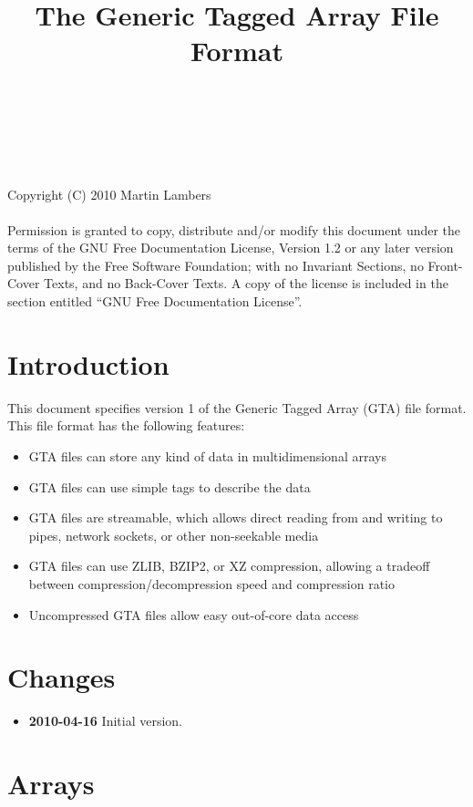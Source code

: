 \documentclass[a4paper,11pt]{article}
\begin{document}
\title{The Generic Tagged Array File Format}
\author{~}
\date{~}
\maketitle

\noindent
Copyright (C) 2010 Martin Lambers\\~\\
Permission is granted to copy, distribute and/or modify this document
under the terms of the GNU Free Documentation License, Version 1.2 or
any later version published by the Free Software Foundation; with no
Invariant Sections, no Front-Cover Texts, and no Back-Cover Texts.  A
copy of the license is included in the section entitled ``GNU Free
Documentation License''.


\section{Introduction}

This document specifies version 1 of the Generic Tagged Array (GTA) file format.
This file format has the following features:
\begin{itemize}
\item GTA files can store any kind of data in multidimensional arrays
\item GTA files can use simple tags to describe the data
\item GTA files are streamable, which allows direct reading from and
	writing to pipes, network sockets, or other non-seekable media
\item GTA files can use ZLIB, BZIP2, or XZ compression, 
	allowing a tradeoff between compression/decompression speed and
	compression ratio
\item Uncompressed GTA files allow easy out-of-core data access
\end{itemize}

\section{Changes}

\begin{itemize}
\item \textbf{2010-04-16} Initial version.
\end{itemize}


\section{Arrays}
\end{document}
